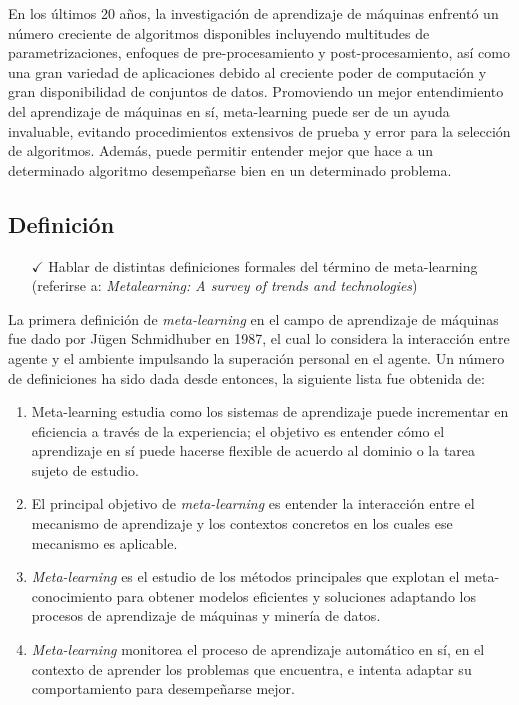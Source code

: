 En los últimos 20 años, la investigación de aprendizaje de máquinas enfrentó un número creciente de algoritmos disponibles incluyendo multitudes de parametrizaciones, enfoques de pre-procesamiento y post-procesamiento, así como una gran variedad de aplicaciones debido al creciente poder de computación y gran disponibilidad de conjuntos de datos. Promoviendo un mejor entendimiento del aprendizaje de máquinas en sí, meta-learning puede ser de un ayuda invaluable, evitando procedimientos extensivos de prueba y error para la selección de algoritmos. Además, puede permitir entender mejor que hace a un determinado algoritmo desempeñarse bien en un determinado problema.

\subsection{Definición}

\begin{itemize}
	\item[$\checkmark$] Hablar de distintas definiciones formales del término de meta-learning (referirse a:  \textit{Metalearning: A survey of trends and technologies})
\end{itemize}

La primera definición de \textit{meta-learning} en el campo de aprendizaje de máquinas fue dado por J\"ugen Schmidhuber en 1987, el cual lo considera la interacción entre agente y el ambiente impulsando la superación personal en el agente. Un número de definiciones ha sido dada desde entonces, la siguiente lista fue obtenida de:

\begin{enumerate}
	\item Meta-learning estudia como los sistemas de aprendizaje puede incrementar en eficiencia a través de la experiencia; el objetivo es entender cómo el aprendizaje en sí puede hacerse flexible de acuerdo al dominio o la tarea sujeto de estudio.
	\item El principal objetivo de \emph{meta-learning} es entender la interacción entre el mecanismo de aprendizaje y los contextos concretos en los cuales ese mecanismo es aplicable.
	\item \emph{Meta-learning} es el estudio de los métodos principales que explotan el meta-conocimiento para obtener modelos eficientes y soluciones adaptando los procesos de aprendizaje de máquinas y minería de datos.
	\item \emph{Meta-learning} monitorea el proceso de aprendizaje automático en sí, en el contexto de aprender los problemas que encuentra, e intenta adaptar su comportamiento para desempeñarse mejor.
\end{enumerate}

